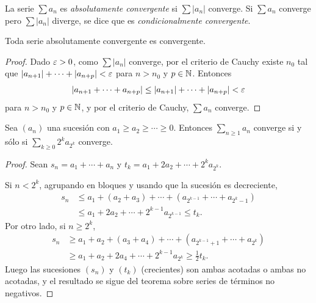 \begin{definition}
  La serie \(\sum a_n\) es \emph{absolutamente convergente} si \(\sum |a_n|\) converge. Si \(\sum a_n\) converge pero \(\sum |a_n|\) diverge, se dice que es \emph{condicionalmente convergente}.
\end{definition}

\begin{theorem}
  Toda serie absolutamente convergente es convergente.
\end{theorem}

\begin{proof}
  Dado \(\varepsilon > 0\), como \(\sum |a_n|\) converge, por el criterio de Cauchy existe \(n_0\) tal que \(|a_{n+1}| + \cdots + |a_{n+p}| < \varepsilon\) para \(n > n_0\) y \(p \in \mathbb{N}\). Entonces
  \[
    |a_{n+1} + \cdots + a_{n+p}| \leq |a_{n+1}| + \cdots + |a_{n+p}| < \varepsilon
  \]
  para \(n > n_0\) y \(p \in \mathbb{N}\), y por el criterio de Cauchy, \(\sum a_n\) converge.
\end{proof}

\begin{theorem}
  Sea \({(a_n)}\) una sucesión con \(a_1 \geq a_2 \geq \cdots \geq 0\). Entonces \(\sum_{n \geq 1} a_n\) converge si y sólo si \(\sum_{k \geq 0} 2^k a_{2^k}\) converge.
\end{theorem}

\begin{proof}
  Sean \(s_n = a_1 + \cdots + a_n\) y \(t_k = a_1 + 2 a_2 + \cdots + 2^k a_{2^k}\).

  Si \(n < 2^k\), agrupando en bloques y usando que la sucesión es decreciente,
  \begin{align*}
    s_n & \leq a_1 + (a_2 + a_3) + \cdots + (a_{2^{k-1}} + \cdots + a_{2^k - 1}) \\
        & \leq a_1 + 2 a_2 + \cdots + 2^{k-1} a_{2^{k-1}} \leq t_k.
  \end{align*}
  Por otro lado, si \(n \geq 2^k\),
  \begin{align*}
    s_n & \geq a_1 + a_2 + (a_3 + a_4) + \cdots + (a_{2^{k-1} + 1} + \cdots + a_{2^k}) \\
        & \geq a_1 + a_2 + 2 a_4 + \cdots + 2^{k-1} a_{2^k} \geq \frac{1}{2} t_k.
  \end{align*}
  Luego las sucesiones \({(s_n)}\) y \({(t_k)}\) (crecientes) son ambas acotadas o ambas no acotadas, y el resultado se sigue del teorema sobre series de términos no negativos.
\end{proof}
